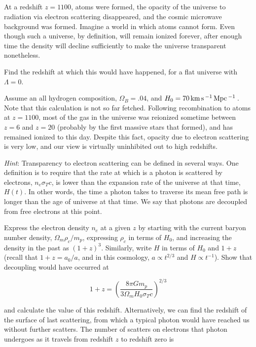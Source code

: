 \documentclass[12pt]{article}
\begin{document}
\subsection{} %

At a redshift \(z = 1100\), atoms were formed, the opacity of the universe to radiation via electron scattering disappeared, and the cosmic microwave background was formed. Imagine a world in which atoms cannot form. Even though such a universe, by definition, will remain ionized forever, after enough time the density will decline sufficiently to make the universe transparent nonetheless.

Find the redshift at which this would have happened, for a flat universe with \(\Lambda=0\).

Assume an all hydrogen composition, \(\Omega_B = .04\), and \(H_0 = 70\,\mathrm{km\,}\mathrm{s}\,^{-1}\,\mathrm{Mpc}\,^{-1}\,\). Note that this calculation is not so far fetched. Following recombination to atoms at \(z=1100\), most of the gas in the universe was reionized sometime between \(z=6\) and \(z=20\) (probably by the first massive stars that formed), and has remained ionized to this day. Despite this fact, opacity due to electron scattering is very low, and our view is virtually uninhibited out to high redshifts.

\textit{Hint}: Transparency to electron scattering can be defined in several ways. One definition is to require that the rate at which is a photon is scattered by electrons, \(n_e\sigma_T c\), is lower than the expansion rate of the universe at that time, \(H(t)\). In other words, the time a photon takes to traverse its mean free path is longer than the age of universe at that time. We say that photons are decoupled from free electrons at this point.

Express the electron density \(n_e\) at a given \(z\) by starting with the current baryon number density, \(\Omega_m \rho_c /m_p\), expressing \(\rho_c\) in terms of \(H_0\), and increasing the density in the past as \((1+z)^3\). Similarly, write \(H\) in terms of \(H_0\) and \(1+z\) (recall that \( 1+z = a_0/a\), and in this cosmology, \(a \propto t^{2/3}\) and \(H \propto t^{-1}\)). Show that decoupling would have occurred at 

\[ 1+z = \left( \frac{8\pi G m_p}{3 \Omega_m H_0 \sigma_T c} \right)^{2/3}
\]

and calculate the value of this redshift. Alternatively, we can find the redshift of the surface of last scattering, from which a typical photon would have reached us without further scatters. The number of scatters on electrons that photon undergoes as it travels from redshift \(z\) to redshift zero is
\end{document}
